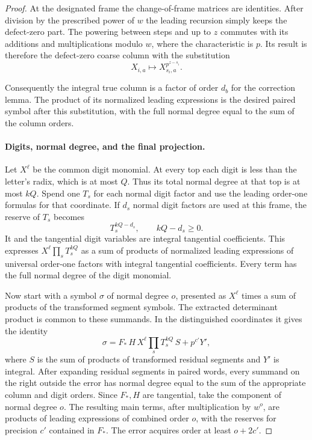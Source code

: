 \begin{proof}
At the designated frame the change-of-frame matrices are
identities. After division by the prescribed power of \(w\)
the leading recursion simply keeps the defect-zero part. The
powering between steps and up to \(z\) commutes with its
additions and multiplications modulo \(w\), where the
characteristic is \(p\). Its result is therefore the
defect-zero coarse column with the substitution
\[
 X_{i,a}\mapsto X_{s_i,a}^{p^{z-s_i}}.
\]

Consequently the integral true column is a factor of order
\(d_b\) for the correction lemma. The product of its
normalized leading expressions is the desired paired symbol
after this substitution, with the full normal degree equal
to the sum of the column orders.  \label{cor:plane-symbols-1}

\paragraph{Digits, normal degree, and the final projection.}
Let \(X^\ell\) be the common digit monomial. At every top
each digit is less than the letter's radix, which is at
most \(Q\). Thus its total normal degree at that top is at
most \(kQ\). Spend one \(T_s\) for each normal digit factor
and use the leading order-one formulas for that coordinate.
If \(d_s\) normal digit factors are used at this frame, the reserve of \(T_s\) becomes
\[
 T_s^{kQ-d_s},\qquad kQ-d_s\ge0.
\]
It and the tangential digit variables are integral tangential coefficients. This
expresses \(X^\ell\prod_s T_s^{kQ}\) as a sum of products of
normalized leading expressions of universal order-one
factors with integral tangential coefficients. Every term has
the full normal degree of the digit monomial.

Now start with a symbol \(\sigma\) of normal degree \(o\),
presented as \(X^\ell\) times a sum of products of the
transformed segment symbols. The extracted determinant
product is common to these summands. In the distinguished
coordinates it gives the identity
\[
  \sigma =
  F_*\,H\,X^\ell\!\prod_s T_s^{kQ}\,S + p^{c'}Y',
\]
where \(S\) is the sum of products of transformed residual
segments and \(Y'\) is integral. After expanding residual
segments in paired words, every summand on the right outside
the error has normal degree equal to the sum of the
appropriate column and digit orders. Since \(F_*,H\) are
tangential, take the component of normal degree \(o\).
The resulting main terms, after multiplication by \(w^o\),
are products of leading expressions of combined order \(o\),
with the reserves for precision \(c'\) contained in \(F_*\).
The error acquires order at least \(o+2c'\).


\end{proof}
